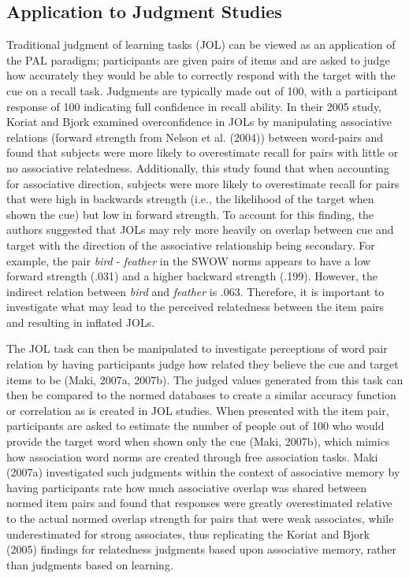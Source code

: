 \documentclass[english,,man]{apa6}
\begin{document}
\hypertarget{application-to-judgment-studies}{%
\subsection{Application to Judgment Studies}\label{application-to-judgment-studies}}

Traditional judgment of learning tasks (JOL) can be viewed as an application of the PAL paradigm; participants are given pairs of items and are asked to judge how accurately they would be able to correctly respond with the target with the cue on a recall task. Judgments are typically made out of 100, with a participant response of 100 indicating full confidence in recall ability. In their 2005 study, Koriat and Bjork examined overconfidence in JOLs by manipulating associative relations (forward strength from Nelson et al. (2004)) between word-pairs and found that subjects were more likely to overestimate recall for pairs with little or no associative relatedness. Additionally, this study found that when accounting for associative direction, subjects were more likely to overestimate recall for pairs that were high in backwards strength (i.e., the likelihood of the target when shown the cue) but low in forward strength. To account for this finding, the authors suggested that JOLs may rely more heavily on overlap between cue and target with the direction of the associative relationship being secondary. For example, the pair \emph{bird} - \emph{feather} in the SWOW norms appears to have a low forward strength (.031) and a higher backward strength (.199). However, the indirect relation between \emph{bird} and \emph{feather} is .063. Therefore, it is important to investigate what may lead to the perceived relatedness between the item pairs and resulting in inflated JOLs.

The JOL task can then be manipulated to investigate perceptions of word pair relation by having participants judge how related they believe the cue and target items to be (Maki, 2007a, 2007b). The judged values generated from this task can then be compared to the normed databases to create a similar accuracy function or correlation as is created in JOL studies. When presented with the item pair, participants are asked to estimate the number of people out of 100 who would provide the target word when shown only the cue (Maki, 2007b), which mimics how association word norms are created through free association tasks. Maki (2007a) investigated such judgments within the context of associative memory by having participants rate how much associative overlap was shared between normed item pairs and found that responses were greatly overestimated relative to the actual normed overlap strength for pairs that were weak associates, while underestimated for strong associates, thus replicating the Koriat and Bjork (2005) findings for relatedness judgments based upon associative memory, rather than judgments based on learning.
\end{document}

